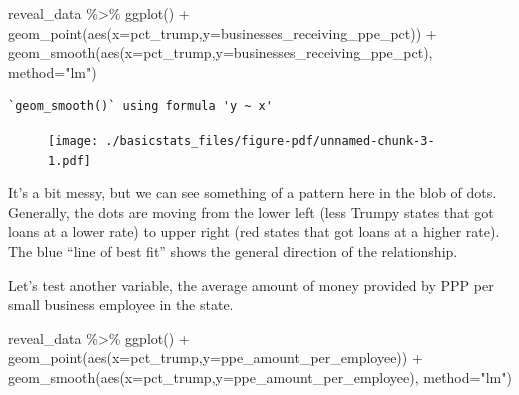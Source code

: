 \documentclass[
  letterpaper,
  DIV=11,
  numbers=noendperiod]{scrreprt}
\newenvironment{Shaded}{\begin{snugshade}}{\end{snugshade}}
\newcommand{\AttributeTok}[1]{\textcolor[rgb]{0.40,0.45,0.13}{#1}}
\newcommand{\FunctionTok}[1]{\textcolor[rgb]{0.28,0.35,0.67}{#1}}
\newcommand{\NormalTok}[1]{\textcolor[rgb]{0.00,0.23,0.31}{#1}}
\newcommand{\SpecialCharTok}[1]{\textcolor[rgb]{0.37,0.37,0.37}{#1}}
\newcommand{\StringTok}[1]{\textcolor[rgb]{0.13,0.47,0.30}{#1}}
\begin{document}
\begin{Shaded}
\begin{Highlighting}[]
\NormalTok{reveal\_data }\SpecialCharTok{\%\textgreater{}\%}
  \FunctionTok{ggplot}\NormalTok{() }\SpecialCharTok{+}
  \FunctionTok{geom\_point}\NormalTok{(}\FunctionTok{aes}\NormalTok{(}\AttributeTok{x=}\NormalTok{pct\_trump,}\AttributeTok{y=}\NormalTok{businesses\_receiving\_ppe\_pct)) }\SpecialCharTok{+}
  \FunctionTok{geom\_smooth}\NormalTok{(}\FunctionTok{aes}\NormalTok{(}\AttributeTok{x=}\NormalTok{pct\_trump,}\AttributeTok{y=}\NormalTok{businesses\_receiving\_ppe\_pct), }\AttributeTok{method=}\StringTok{"lm"}\NormalTok{)}
\end{Highlighting}
\end{Shaded}

\begin{verbatim}
`geom_smooth()` using formula 'y ~ x'
\end{verbatim}

\begin{figure}[H]

{\centering \texttt{[image: ./basicstats\_files/figure-pdf/unnamed-chunk-3-1.pdf]}

}

\end{figure}

It's a bit messy, but we can see something of a pattern here in the blob
of dots. Generally, the dots are moving from the lower left (less Trumpy
states that got loans at a lower rate) to upper right (red states that
got loans at a higher rate). The blue ``line of best fit'' shows the
general direction of the relationship.

Let's test another variable, the average amount of money provided by PPP
per small business employee in the state.

\begin{Shaded}
\begin{Highlighting}[]
\NormalTok{reveal\_data }\SpecialCharTok{\%\textgreater{}\%}
  \FunctionTok{ggplot}\NormalTok{() }\SpecialCharTok{+}
  \FunctionTok{geom\_point}\NormalTok{(}\FunctionTok{aes}\NormalTok{(}\AttributeTok{x=}\NormalTok{pct\_trump,}\AttributeTok{y=}\NormalTok{ppe\_amount\_per\_employee)) }\SpecialCharTok{+}
  \FunctionTok{geom\_smooth}\NormalTok{(}\FunctionTok{aes}\NormalTok{(}\AttributeTok{x=}\NormalTok{pct\_trump,}\AttributeTok{y=}\NormalTok{ppe\_amount\_per\_employee), }\AttributeTok{method=}\StringTok{"lm"}\NormalTok{)}
\end{Highlighting}
\end{Shaded}
\end{document}
